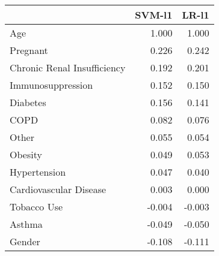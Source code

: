 \begin{tabular}{lrr}
\toprule
{} &  SVM-l1 &  LR-l1 \\
\midrule
Age                         &   1.000 &  1.000 \\
Pregnant                    &   0.226 &  0.242 \\
Chronic Renal Insufficiency &   0.192 &  0.201 \\
Immunosuppression           &   0.152 &  0.150 \\
Diabetes                    &   0.156 &  0.141 \\
COPD                        &   0.082 &  0.076 \\
Other                       &   0.055 &  0.054 \\
Obesity                     &   0.049 &  0.053 \\
Hypertension                &   0.047 &  0.040 \\
Cardiovascular Disease      &   0.003 &  0.000 \\
Tobacco Use                 &  -0.004 & -0.003 \\
Asthma                      &  -0.049 & -0.050 \\
Gender                      &  -0.108 & -0.111 \\
\bottomrule
\end{tabular}
